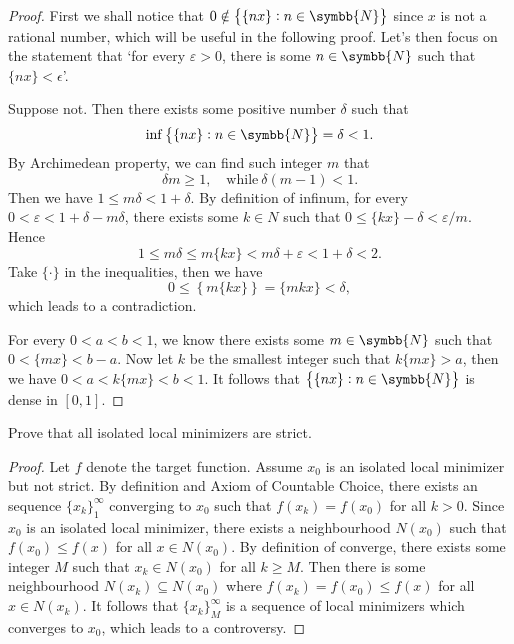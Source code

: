 \documentclass[lineno]{assignment}
\theoremstyle{plain}
\begin{document}
    \begin{proof}
        First we shall notice that $0\notin\left\{\{nx\}:n\in\symbb{N}\right\}$ since $x$ is not a rational number, which will be useful in the following proof. Let's then focus on the statement that `for every $\varepsilon>0$, there is some $n\in\symbb{N}$ such that $\{nx\}<\epsilon$'.

        Suppose not. Then there exists some positive number $\delta$ such that
        \begin{equation}
            \inf \left\{\{nx\}:n\in\symbb{N}\right\}=\delta<1.
        \end{equation}
        By Archimedean property, we can find such integer $m$ that
        \begin{equation}
            \delta m\geq 1,\quad\text{while}\ \delta(m-1)<1.
        \end{equation}
        Then we have $1\leq m\delta<1+\delta$. By definition of infinum, for every $0<\varepsilon<1+\delta-m\delta$, there exists some $k\in N$ such that $0\leq\{kx\}-\delta<\varepsilon/m$. Hence
        \begin{equation}
            1\leq m\delta \leq m\{kx\}<m\delta+\varepsilon<1+\delta<2.
        \end{equation}
        Take $\{\cdot\}$ in the inequalities, then we have
        \begin{equation}
            0\leq \left\{m\{kx\}\right\} = \{mkx\}<\delta,
        \end{equation}
        which leads to a contradiction.

        For every $0<a<b<1$, we know there exists some $m\in\symbb{N}$ such that $0<\{mx\}<b-a$. Now let $k$ be the smallest integer such that $k\{mx\}>a$, then we have $0<a<k\{mx\}<b<1$. It follows that $\left\{\{nx\}:n\in\symbb{N}\right\}$ is dense in $[0, 1]$.
    \end{proof}
    \begin{problem}
        Prove that all isolated local minimizers are strict.
    \end{problem}
    \begin{proof}
        Let $f$ denote the target function. Assume $x_0$ is an isolated local minimizer but not strict. By definition and Axiom of Countable Choice, there exists an sequence $\{x_k\}_1^\infty$ converging to $x_0$ such that $f(x_k)=f(x_0)$ for all $k>0$. Since $x_0$ is an isolated local minimizer, there exists a neighbourhood $N(x_0)$ such that $f(x_0)\leq f(x)$ for all $x\in N(x_0)$. By definition of converge, there exists some integer $M$ such that $x_k\in N(x_0)$ for all $k\geq M$. Then there is some neighbourhood $N(x_k)\subseteq N(x_0)$ where $f(x_k)=f(x_0)\leq f(x)$ for all $x\in N(x_k)$. It follows that $\{x_k\}_M^\infty$ is a sequence of local minimizers which converges to $x_0$, which leads to a controversy.
    \end{proof}
\end{document}
